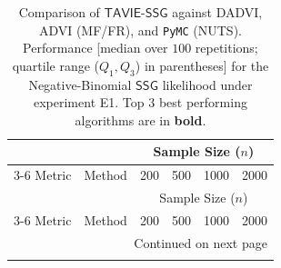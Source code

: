 \documentclass[12pt]{article}
\numberwithin{equation}{section}
\newcommand{\tssg}{\mathsf{TAVIE}\text{-}\mathsf{SSG}}
\begin{document}
{\scriptsize
\setlength{\tabcolsep}{3pt} %
\renewcommand{\arraystretch}{1.15}%
\begin{longtable}{llcccc}
\caption{\footnotesize{Comparison of $\tssg$ against DADVI, ADVI (MF/FR), and \texttt{PyMC} (NUTS). Performance [median over $100$ repetitions; quartile range ($Q_1, Q_3$)  in parentheses] for the Negative-Binomial $\mathsf{SSG}$ likelihood under experiment E1. { Top $3$ best performing algorithms are in \textbf{bold}.}}} \label{tab:negbin_singlep_multin}\\
\toprule
\toprule
 &  & \multicolumn{4}{c}{Sample Size ($n$)} \\
\cmidrule(lr){3-6}
Metric & Method & 200 & 500 & 1000 & 2000 \\
\midrule
\endfirsthead
\toprule
 &  & \multicolumn{4}{c}{Sample Size ($n$)} \\
\cmidrule(lr){3-6}
Metric & Method & 200 & 500 & 1000 & 2000 \\
\midrule
\endhead
\midrule
\multicolumn{6}{r}{Continued on next page} \\
\midrule
\endfoot
\bottomrule
\endlastfoot


\end{longtable}}
\end{document}
